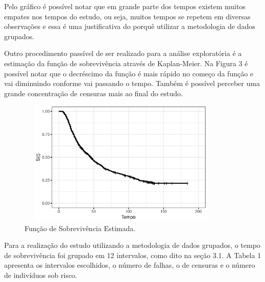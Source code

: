 \documentclass[a4paper,12pt]{article}
\begin{document}
Pelo gráfico é possível notar que em grande parte dos tempos existem muitos empates nos tempos do estudo, ou seja, muitos tempos se repetem em diversas observações e essa é uma justificativa do porquê utilizar a metodologia de dados grupados.

Outro procedimento passível de ser realizado para a análise exploratória é a estimação da função de sobrevivência através de Kaplan-Meier. Na Figura 3 é possível notar que o decréscimo da função é mais rápido no começo da função e vai diminuindo conforme vai passando o tempo. Também é possível perceber uma grande concentração de censuras mais ao final do estudo. 

\begin{figure}[H] \label{fig:surv_vit}
  \begin{center}
    \includegraphics[width=10cm, height = 6cm]{surv_vit}
    \caption{Função de Sobrevivência Estimada.}
  \end{center}
\end{figure}

Para a realização do estudo utilizando a metodologia de dados grupados, o tempo de sobrevivência foi grupado em 12 intervalos, como dito na seção 3.1. A Tabela 1 apresenta os intervalos escolhidos, o número de falhas, o de censuras e o número de indivíduos sob risco.
\end{document}
